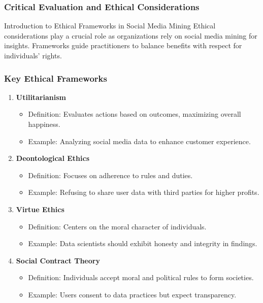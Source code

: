 \documentclass{beamer}
\begin{document}
\begin{frame}[fragile]
    \frametitle{Critical Evaluation and Ethical Considerations}
    \begin{block}{Introduction to Ethical Frameworks in Social Media Mining}
        Ethical considerations play a crucial role as organizations rely on social media mining for insights. Frameworks guide practitioners to balance benefits with respect for individuals' rights.
    \end{block}
\end{frame}

\begin{frame}[fragile]
    \frametitle{Key Ethical Frameworks}
    \begin{enumerate}
        \item \textbf{Utilitarianism}
        \begin{itemize}
            \item Definition: Evaluates actions based on outcomes, maximizing overall happiness.
            \item Example: Analyzing social media data to enhance customer experience.
        \end{itemize}
        
        \item \textbf{Deontological Ethics}
        \begin{itemize}
            \item Definition: Focuses on adherence to rules and duties.
            \item Example: Refusing to share user data with third parties for higher profits.
        \end{itemize}

        \item \textbf{Virtue Ethics}
        \begin{itemize}
            \item Definition: Centers on the moral character of individuals.
            \item Example: Data scientists should exhibit honesty and integrity in findings.
        \end{itemize}
        
        \item \textbf{Social Contract Theory}
        \begin{itemize}
            \item Definition: Individuals accept moral and political rules to form societies.
            \item Example: Users consent to data practices but expect transparency.
        \end{itemize}
    \end{enumerate}
\end{frame}
\end{document}
